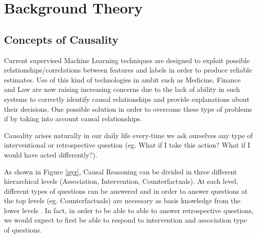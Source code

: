 \chapter{Background Theory}

  
\newenvironment{conditions}[1][where:]
  {#1 \begin{tabular}[t]{>{$}l<{$} @{${}={}$} l}}
  {\end{tabular}\\[\belowdisplayskip]}

\label{ch:background}

\section{Concepts of Causality}
\label{concepts}

Current supervised Machine Learning techniques are designed to exploit possible relationships/correlations between features and labels in order to produce reliable estimates. Use of this kind of technologies in ambit such as Medicine, Finance and Law are now raising increasing concerns due to the lack of ability in such systems to correctly identify causal relationships and provide explanations about their decisions. One possible solution in order to overcome these type of problems if by taking into account causal relationships.

Causality arises naturally in our daily life every-time we ask ourselves any type of interventional or retrospective question (eg. What if I take this action? What if I would have acted differently?).

As shown in Figure \ref{pyr}, Causal Reasoning can be divided in three different hierarchical levels (Association, Intervention, Counterfactuals). At each level, different types of questions can be answered and in order to answer questions at the top levels (eg. Counterfactuals) are necessary as basis knowledge from the lower levels \cite{tools}. In fact, in order to be able to able to answer retrospective questions, we would expect to first be able to respond to intervention and association type of questions.

